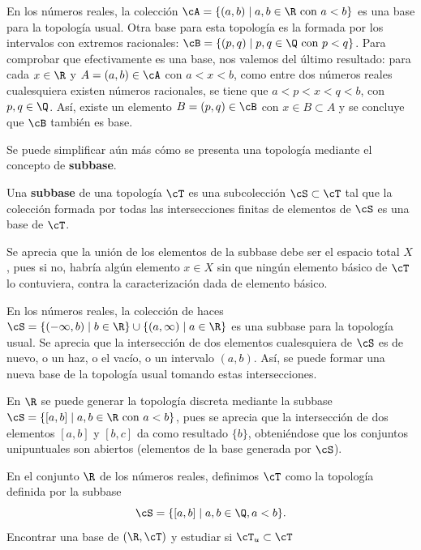 \hypertarget{Base reales usual}{}
\begin{ej}
    En los números reales, la colección $\cA = \{(a,b) \mid a,b \in \R \text{ con } a < b\}$ es una base para la topología usual. Otra base para esta topología es la formada por los intervalos con extremos racionales: $\cB = \{(p,q) \mid p,q \in \Q \text{ con } p < q\}$. Para comprobar que efectivamente es una base, nos valemos del último resultado: para cada $x \in \R$ y $A = (a,b) \in \cA$ con $a < x < b$, como entre dos números reales cualesquiera existen números racionales, se tiene que $ a < p < x < q < b$, con $p,q \in \Q$. Así, existe un elemento $B = (p,q) \in \cB$ con $x \in B \subset A$ y se concluye que $\cB$ también es base.
\end{ej}

Se puede simplificar aún más cómo se presenta una topología mediante el concepto de {\bf subbase}.

\begin{deff}
    Una {\bf subbase} de una topología $\cT$ es una subcolección $\cS\subset\cT$ tal que la colección formada por todas las intersecciones finitas de elementos de $\cS$ es una base de $\cT$.
\end{deff}

Se aprecia que la unión de los elementos de la subbase debe ser el espacio total $X$, pues si no, habría algún elemento $x\in X$ sin que ningún elemento básico de $\cT$ lo contuviera, contra la caracterización dada de elemento básico.

\begin{ejs}
    \item En los números reales, la colección de haces $\cS = \{(-\infty,b) \mid b \in \R\} \cup \{(a, \infty) \mid a \in \R\}$ es una subbase para la topología usual. Se aprecia que la intersección de dos elementos cualesquiera de $\cS$ es de nuevo, o un haz, o el vacío, o un intervalo $(a,b)$. Así, se puede formar una nueva base de la topología usual tomando estas intersecciones.
    \item En $\R$ se puede generar la topología discreta mediante la subbase $\cS = \{[a,b] \mid a,b \in \R \text{ con } a < b\}$, pues se aprecia que la intersección de dos elementos $[a,b]$ y $[b,c]$ da como resultado $\{b\}$, obteniéndose que los conjuntos unipuntuales son abiertos (elementos de la base generada por $\cS$).
\end{ejs}

\begin{ex}
    En el conjunto \(\R\) de los números reales, definimos \(\cT\) como la topología definida por la subbase \[\cS = \{[a,b] \mid a, b \in \Q, a < b\}.\]
    Encontrar una base de \((\R,\cT)\) y estudiar si \(\cT_u \subset \cT\)
\end{ex}

